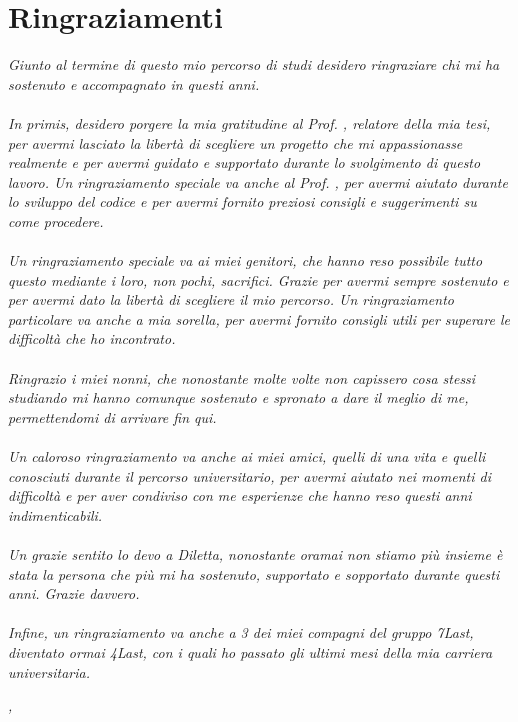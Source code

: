 \cleardoublepage
{}
{}

\bigskip

\begingroup
\let\clearpage\relax
\let\cleardoublepage\relax
\let\cleardoublepage\relax

\chapter*{Ringraziamenti}
\textit{Giunto al termine di questo mio percorso di studi desidero ringraziare chi mi ha sostenuto e accompagnato in questi anni.}
\\\\
\noindent \textit{In primis, desidero porgere la mia gratitudine al Prof. \myProf, relatore della mia tesi, per avermi lasciato la libertà di scegliere un progetto che mi appassionasse realmente e per avermi guidato e supportato durante lo svolgimento di questo lavoro. Un ringraziamento speciale va anche al Prof. \myTutor, per avermi aiutato durante lo sviluppo del codice e per avermi fornito preziosi consigli e suggerimenti su come procedere.}
\\\\
\noindent \textit{Un ringraziamento speciale va ai miei genitori, che hanno reso possibile tutto questo mediante i loro, non pochi, sacrifici. Grazie per avermi sempre sostenuto e per avermi dato la libertà di scegliere il mio percorso. Un ringraziamento particolare va anche a mia sorella, per avermi fornito consigli utili per superare le difficoltà che ho incontrato.}
\\\\
\noindent \textit{Ringrazio i miei nonni, che nonostante molte volte non capissero cosa stessi studiando mi hanno comunque sostenuto e spronato a dare il meglio di me, permettendomi di arrivare fin qui.}
\\\\
\noindent \textit{Un caloroso ringraziamento va anche ai miei amici, quelli di una vita e quelli conosciuti durante il percorso universitario, per avermi aiutato nei momenti di difficoltà e per aver condiviso con me esperienze che hanno reso questi anni indimenticabili.}
\\\\
\noindent \textit{Un grazie sentito lo devo a Diletta, nonostante oramai non stiamo più insieme è stata la persona che più mi ha sostenuto, supportato e sopportato durante questi anni. Grazie davvero.}
\\\\
\noindent \textit{Infine, un ringraziamento va anche a 3 dei miei compagni del gruppo 7Last, diventato ormai 4Last, con i quali ho passato gli ultimi mesi della mia carriera universitaria.}
\bigskip

\noindent\textit{\myLocation, \myTime}
\hfill \myName 

\endgroup
